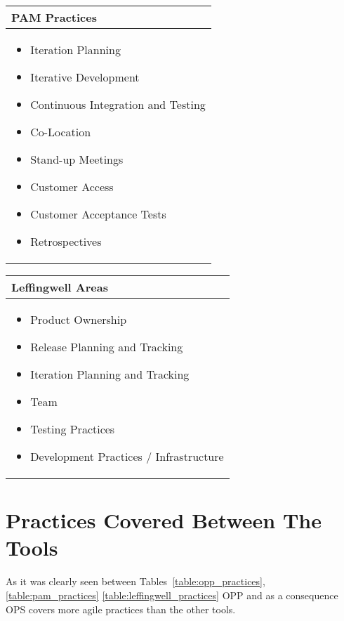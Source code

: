 \begin{minipage}[b]{0.45\textwidth}
  \centering
  \begin{tabular}{| p{7cm} |}
    \hline
     \textbf{PAM Practices}\\ \hline
     \begin{itemize} \item Iteration Planning \item Iterative Development \item Continuous Integration and Testing \item Co-Location \item Stand-up Meetings \item Customer Access \item Customer Acceptance Tests \item Retrospectives \end{itemize}  \\ \hline
  \end{tabular}
  \label{table:pam_practices}
\end{minipage}\qquad
\begin{minipage}[b]{0.5\textwidth}
  \centering
  \begin{tabular}{| p{7cm} |}
    \hline
     \textbf{Leffingwell Areas}\\ \hline
     \begin{itemize} \item Product Ownership \item Release Planning and Tracking \item Iteration Planning and Tracking \item Team \item Testing Practices \item Development Practices / Infrastructure \end{itemize}  \\ \hline
  \end{tabular}
  \label{table:leffingwell_practices}
\end{minipage}

\section{Practices Covered Between The Tools}

As it was clearly seen between Tables~\ref{table:opp_practices}, \ref{table:pam_practices} \ref{table:leffingwell_practices} OPP and as a consequence OPS covers more agile practices than the other tools. \\

